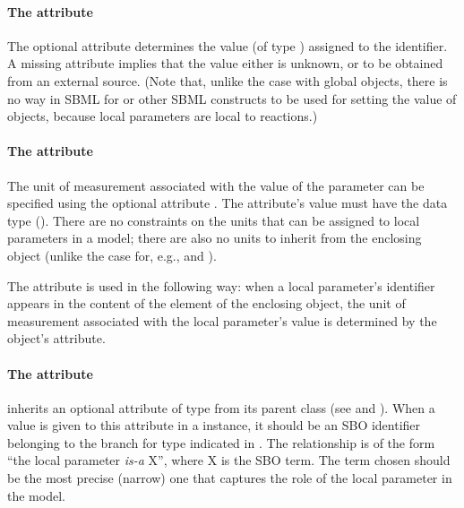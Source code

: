 \paragraph{The  attribute}

The optional attribute  determines the value (of type
) assigned to the identifier.  A missing
 attribute implies that the value either is unknown,
or to be obtained from an external source.  (Note that, unlike the
case with global \Parameter objects, there is no way in SBML
\thisLV for \InitialAssignment or other SBML constructs to be used
for setting the value of \LocalParameter objects, because local
parameters are local to reactions.)


\paragraph{The  attribute}
\label{subsec:localparameter-units}

The unit of measurement associated with the value of the parameter
can be specified using the optional attribute .  The
attribute's value must have the data type 
().  There are no constraints on the
units that can be assigned to local parameters in a model; there
are also no units to inherit from the enclosing \Model object
(unlike the case for, e.g., \Species and \Compartment).

The  attribute is used in the following way: when a
local parameter's identifier appears in the content of the
 element of the enclosing \KineticLaw object, the unit
of measurement associated with the local parameter's value is
determined by the \LocalParameter object's 
attribute.


\paragraph{The  attribute}

\LocalParameter inherits an optional  attribute of
type  from its parent class \SBase (see
 and ).  When a
value is given to this attribute in a \LocalParameter instance, it
should be an SBO identifier belonging to the branch for type
\LocalParameter indicated in .
The relationship is of the form ``the local parameter \emph{is-a}
X'', where X is the SBO term.  The term chosen should be the most
precise (narrow) one that captures the role of the local parameter
in the model.

